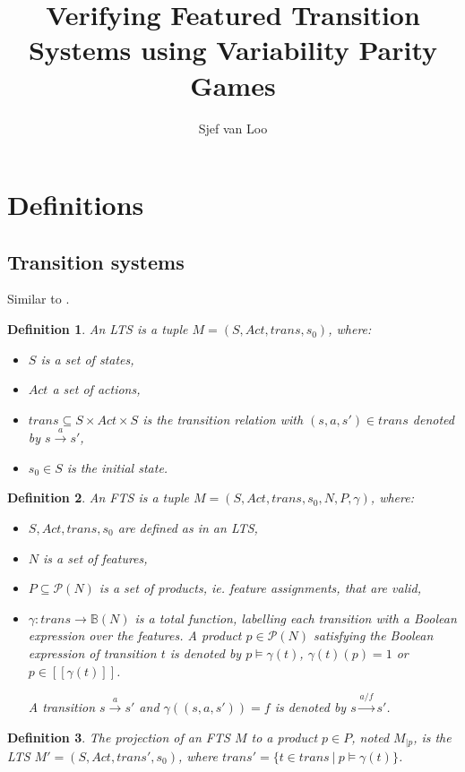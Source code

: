 \documentclass[]{article}
\title{Verifying Featured Transition Systems using Variability Parity Games}
\author{Sjef van Loo}
\newtheorem{definition}{Definition}[section]
\begin{document}
\maketitle

\section{Definitions}
\subsection{Transition systems}
Similar to \cite{Classen2013FeaturedTS}.

\begin{definition}
	\label{def_lts}An LTS is a tuple $M = (S, Act, trans, s_0)$, where:
	\begin{itemize}
		\item $S$ is a set of states,
		\item $Act$ a set of actions,
		\item $trans \subseteq S \times Act \times S$ is the transition relation with $(s,a,s') \in trans$ denoted by $s \xrightarrow a s'$,
		\item $s_0 \in S$ is the initial state.
	\end{itemize}
\end{definition}

\begin{definition}
	\label{def_fts}An FTS is a tuple $M = (S, Act, trans, s_0, N, P, \gamma)$, where:
	\begin{itemize}
		\item $S, Act, trans, s_0$ are defined as in an LTS,
		\item $N$ is a set of features,
		\item $P \subseteq \mathcal{P}(N)$ is a set of products, ie. feature assignments, that are valid,
		\item $\gamma : trans \rightarrow \mathbb{B}(N)$ is a total function, labelling each transition with a Boolean expression over the features. A product $p \in \mathcal{P}(N)$ satisfying the Boolean expression of transition $t$ is denoted by $p \models \gamma(t)$, $\gamma(t)(p) = 1$ or $p \in [\![\gamma(t)]\!]$. 
		
		A transition $s \xrightarrow a s'$ and $\gamma((s,a,s')) = f$ is denoted by $s \xrightarrow {a / f} s'$. 
	\end{itemize}
\end{definition}

\begin{definition}
	\label{def_fts_proj}
	The projection of an FTS $M$ to a product $p \in P$, noted $M_{|p}$, is the LTS $M'=(S,Act,trans', s_0)$, where $trans' = \{t \in trans\ |\ p \models \gamma(t)\}$.
\end{definition}
\end{document}
